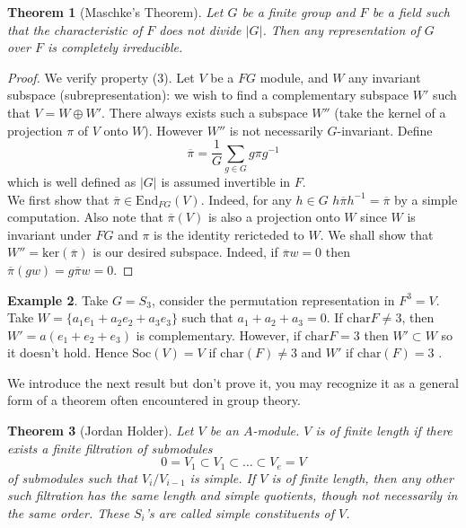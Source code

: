 \documentclass{article}
\newtheorem{theorem}{Theorem}[section]
\theoremstyle{definition}
\newtheorem{example}[theorem]{Example}
\theoremstyle{remark}
\theoremstyle{plain}
\begin{document}
\begin{theorem}[Maschke's Theorem]
	Let $G$ be a finite group and $F$ be a field such that the characteristic of $F$ does not divide $|G|$.
	Then any representation of $G$ over $F$ is completely irreducible.
\end{theorem}
\begin{proof}
	We verify property (3).
	Let $V$ be a $FG$ module, and $W$ any invariant subspace (subrepresentation): we wish to find a complementary subspace $W'$ such that $V = W \oplus W'$.
	There always exists such a subspace $W''$ (take the kernel of a projection $\pi$ of $V$ onto $W$).
	However $W''$ is not necessarily $G$-invariant.
	Define 
	\[ \overline{\pi} = \frac{1}{{G}} \sum_{g \in G} g \pi g^{-1}\]
which is well defined as $|G|$ is assumed invertible in $F$. \\

We first show that $\overline{\pi} \in \text{End}_{FG}(V)$. Indeed, for any $h \in G$ $h \overline{\pi} h^{-1} = \overline{\pi}$ by a simple computation.
Also note that $\overline{\pi}(V)$ is also a projection onto $W$ since $W$ is invariant under $FG$ and $\pi$ is the identity rericteded to $W$.
We shall show that $W'' = \text{ker}(\overline{\pi})$ is our desired subspace. 
Indeed, if $\overline{\pi}w = 0$ then $\overline{\pi}(gw) = g \overline{\pi} w = 0$.
\end{proof}

\begin{example}
	Take $G = S_3$, consider the permutation representation in $F^3 = V$.
	Take $W = \{a_1e_1  + a_2e_2 + a_3e_3\}$ such that $a_1 + a_2 + a_3 = 0$.
	If $\text{char} F \neq 3$, then $W' = a(e_1 + e_2 + e_3)$ is complementary.
	However, if $\text{char} F = 3$ then $W' \subset W$ so it doesn't hold.
	Hence $\text{Soc}(V) = V$ if $\text{char}(F) \neq 3$ and $W'$ if $\text{char}(F) = 3$ .
\end{example}

We introduce the next result but don't prove it, you may recognize it as a general form of a theorem often encountered in group theory.

\begin{theorem}[Jordan Holder]
	Let $V$ be an $A$-module. $V$ is of finite length if there exists a finite filtration of submodules 
	\[0 = V_1 \subset V_1 \subset \dots \subset V_e = V\]
	of submodules such that $V_i/V_{i-1}$ is simple. 
	If $V$ is of finite length, then any other such filtration has the same length and simple quotients, though not necessarily in the same order.
	These $S_i$'s are called \textit{simple constituents} of $V$.
\end{theorem}
\end{document}
